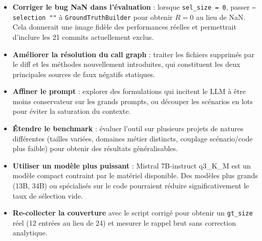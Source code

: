 \documentclass[12pt,a4paper]{article}
\begin{document}
\begin{itemize}[noitemsep]
  \item \textbf{Corriger le bug NaN dans l'évaluation} : lorsque
        \texttt{sel\_size = 0}, passer \texttt{--selection ""} à
        \texttt{GroundTruthBuilder} pour obtenir $R = 0$ au lieu de NaN.
        Cela donnerait une image fidèle des performances réelles et
        permettrait d'inclure les 21 commits actuellement exclus.

  \item \textbf{Améliorer la résolution du call graph} : traiter les
        fichiers supprimés par le diff et les méthodes nouvellement
        introduites, qui constituent les deux principales sources de
        faux négatifs statiques.

  \item \textbf{Affiner le prompt} : explorer des formulations qui
        incitent le LLM à être moins conservateur sur les grands prompts,
        ou découper les scénarios en lots pour éviter la saturation du
        contexte.

  \item \textbf{Étendre le benchmark} : évaluer l'outil sur plusieurs
        projets de natures différentes (tailles variées, domaines métier
        distincts, couplage scénario/code plus faible) pour obtenir des
        résultats généralisables.

  \item \textbf{Utiliser un modèle plus puissant} : Mistral 7B-instruct
        q3\_K\_M est un modèle compact contraint par le matériel disponible.
        Des modèles plus grands (13B, 34B) ou spécialisés sur le code
        pourraient réduire significativement le taux de sélection vide.

  \item \textbf{Re-collecter la couverture} avec le script corrigé pour
        obtenir un \texttt{gt\_size} réel (12 entrées au lieu de 24) et
        mesurer le rappel brut sans correction analytique.
\end{itemize}
\end{document}

